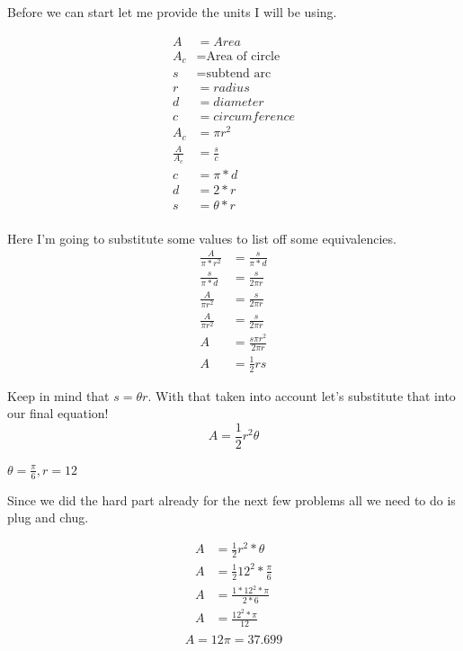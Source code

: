 \documentclass[10pt,letterpaper]{amspset}
\begin{document}
\begin{solution}[Solution]
Before we can start let me provide the units I will be using.  

\begin{align}
    A &= Area \\
    A_c &= \textrm{Area of circle} \\
    s &= \textrm{subtend arc} \\
    r &= radius \\
    d &= diameter \\
    c &= circumference \\
    A_c &= \pi r^2 \\
    \frac{A}{A_c} &= \frac{s}{c} \\
    c &= \pi * d \\
    d &= 2 * r \\
    s &= \theta * r \\ 
\end{align}

Here I'm going to substitute some values to list off some equivalencies.
\begin{align}
    \frac{A}{\pi * r^2} &= \frac{s}{\pi * d} \\[+3mm]
    \frac{s}{\pi * d} &= \frac{s}{2 \pi  r} \\[+3mm]
    \frac{A}{\pi r^2} &= \frac{s}{2 \pi  r} \\[+3mm]
    \frac{A}{\pi r^2} &= \frac{s}{2 \pi  r} \\[+3mm]
    A &=\frac{s \pi r^2}{2 \pi r} \\[+3mm]
    A &= \frac{1}{2} r s
\end{align}

Keep in mind that $s = \theta r$. With that taken into account let's substitute that into our final equation!
\[\boxed{A = \frac{1}{2} r^2 \theta}\]
\end{solution}

\pagebreak


\begin{problem}[57.]
$\theta = \frac{\pi}{6}, r = 12$
\end{problem}

\begin{solution}[Solution]
Since we did the hard part already for the next few problems all we need to do is plug and chug.

\begin{align}
    A &= \frac{1}{2} r^2 * \theta \\[+3mm]
    A &= \frac{1}{2} 12^2 * \frac{\pi}{6} \\[+3mm]
    A &= \frac{1 * 12^2 * \pi}{2 * 6} \\[+3mm]
    A &= \frac{12^2 * \pi}{12} \\[+3mm]
\end{align}
\[\boxed{A = 12 \pi = 37.699}\]
\end{solution}
\end{document}
